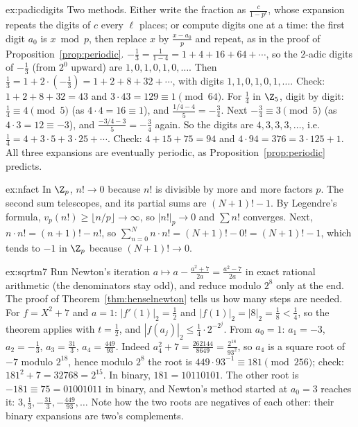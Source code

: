 \begin{solution}{ex:padicdigits}
\idea Two methods. Either write the fraction as $\frac c{1-p^\ell}$, whose expansion repeats the digits of $c$ every $\ell$ places; or compute digits one at a time: the first digit $a_0$ is $x\bmod p$, then replace $x$ by $\frac{x-a_0}p$ and repeat, as in the proof of Proposition~\ref{prop:periodic}.
\writeup $-\frac13=\frac1{1-4}=1+4+16+64+\cdots$, so the $2$-adic digits of $-\frac13$ (from $2^0$ upward) are $1,0,1,0,1,0,\dots$. Then $\frac13=1+2\cdot\left(-\frac13\right)=1+2+8+32+\cdots$, with digits $1,1,0,1,0,1,\dots$. Check: $1+2+8+32=43$ and $3\cdot43=129\equiv1\pmod{64}$. For $\frac14$ in $\Z_5$, digit by digit: $\frac14\equiv4\pmod5$ (as $4\cdot4=16\equiv1$), and $\frac{1/4-4}5=-\frac34$. Next $-\frac34\equiv3\pmod5$ (as $4\cdot3=12\equiv-3$), and $\frac{-3/4-3}5=-\frac34$ again. So the digits are $4,3,3,3,\dots$, i.e.\ $\frac14=4+3\cdot5+3\cdot25+\cdots$. Check: $4+15+75=94$ and $4\cdot94=376=3\cdot125+1$. All three expansions are eventually periodic, as Proposition~\ref{prop:periodic} predicts.
\end{solution}

\begin{solution}{ex:nfact}
\idea In $\Z_p$, $n!\to0$ because $n!$ is divisible by more and more factors $p$. The second sum telescopes, and its partial sums are $(N+1)!-1$.
\writeup By Legendre's formula, $v_p(n!)\ge\lfloor n/p\rfloor\to\infty$, so $|n!|_p\to0$ and $\sum n!$ converges. Next, $n\cdot n!=(n+1)!-n!$, so $\sum_{n=0}^Nn\cdot n!=(N+1)!-0!=(N+1)!-1$, which tends to $-1$ in $\Z_p$ because $(N+1)!\to0$.
\end{solution}

\begin{solution}{ex:sqrtm7}
\idea Run Newton's iteration $a\mapsto a-\frac{a^2+7}{2a}=\frac{a^2-7}{2a}$ in exact rational arithmetic (the denominators stay odd), and reduce modulo $2^8$ only at the end. The proof of Theorem~\ref{thm:henselnewton} tells us how many steps are needed.
\writeup For $f=X^2+7$ and $a=1$: $|f'(1)|_2=\frac12$ and $|f(1)|_2=|8|_2=\frac18<\frac14$, so the theorem applies with $t=\frac12$, and $|f(a_j)|_2\le\frac14\cdot2^{-2^j}$. From $a_0=1$: $a_1=-3$, $a_2=-\frac13$, $a_3=\frac{31}3$, $a_4=\frac{449}{93}$. Indeed $a_4^2+7=\frac{262144}{8649}=\frac{2^{18}}{93^2}$, so $a_4$ is a square root of $-7$ modulo $2^{18}$, hence modulo $2^8$ the root is $449\cdot93^{-1}\equiv181\pmod{256}$; check: $181^2+7=32768=2^{15}$. In binary, $181=10110101$. The other root is $-181\equiv75=01001011$ in binary, and Newton's method started at $a_0=3$ reaches it: $3,\frac13,-\frac{31}3,-\frac{449}{93},\dots$ Note how the two roots are negatives of each other: their binary expansions are two's complements.
\end{solution}

